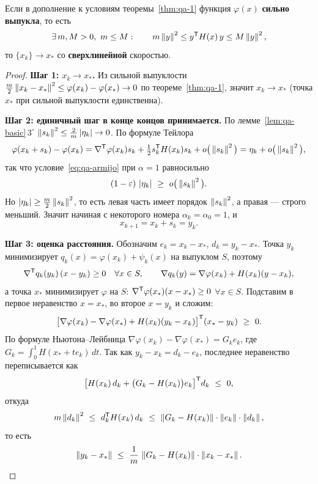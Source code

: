 \begin{theorem}\label{thm:qa-2}
Если в дополнение к условиям теоремы~\ref{thm:qa-1} функция $\varphi(x)$
\textbf{сильно выпукла}, то есть
\[
  \exists\, m, M > 0,\ m \le M : \qquad
  m \left\lVert y \right\rVert^2 \le y^{\mathsf{T}} H(x)\, y \le M \left\lVert y \right\rVert^2 ,
\]
то $\{x_k\} \to x_*$ со \textbf{сверхлинейной} скоростью.
\end{theorem}

\begin{idea}[title={Доказательство (на лекции не приводилось)}]
\begin{proof}
\textbf{Шаг 1: $x_k \to x_*$.} Из сильной выпуклости
$\tfrac{m}{2}\left\lVert x_k - x_* \right\rVert^2 \le \varphi(x_k) - \varphi(x_*) \to 0$ по
теореме~\ref{thm:qa-1}, значит $x_k \to x_*$ (точка $x_*$ при сильной
выпуклости единственна).

\medskip
\textbf{Шаг 2: единичный шаг в конце концов принимается.} По
лемме~\ref{lem:qa-basic}\,$3^\circ$
$\left\lVert s_k \right\rVert^2 \le \tfrac{2}{m}\left\lvert \eta_k \right\rvert \to 0$. По формуле Тейлора
\[
  \varphi(x_k + s_k) - \varphi(x_k)
  = \nabla^{\mathsf{T}}\varphi(x_k)s_k + \tfrac12 s_k^{\mathsf{T}} H(x_k) s_k + o\big(\left\lVert s_k \right\rVert^2\big)
  = \eta_k + o\big(\left\lVert s_k \right\rVert^2\big) ,
\]
так что условие~\eqref{eq:qa-armijo} при $\alpha = 1$ равносильно
\[
  (1 - \eps)\,\abs{\eta_k} \ \ge\ o\big(\norm{s_k}^2\big) .
\]
Но $\left\lvert \eta_k \right\rvert \ge \tfrac{m}{2}\left\lVert s_k \right\rVert^2$, то есть левая часть имеет
порядок $\left\lVert s_k \right\rVert^2$, а правая — строго меньший. Значит начиная с некоторого
номера $\alpha_k = \alpha_0 = 1$, и
\[
  x_{k+1} = x_k + s_k = y_k .
\]

\medskip
\textbf{Шаг 3: оценка расстояния.} Обозначим
$e_k = x_k - x_*$, $d_k = y_k - x_*$. Точка $y_k$ минимизирует
$q_k(x) = \varphi(x_k) + \psi_k(x)$ на выпуклом $S$, поэтому
\[
  \nabla^{\mathsf{T}} q_k(y_k)\,(x - y_k) \ge 0 \quad \forall x \in S ,
  \qquad
  \nabla q_k(y) = \nabla\varphi(x_k) + H(x_k)(y - x_k) ,
\]
а точка $x_*$ минимизирует $\varphi$ на $S$:
$\nabla^{\mathsf{T}}\varphi(x_*)(x - x_*) \ge 0$ $\forall x \in S$. Подставим в первое
неравенство $x = x_*$, во второе $x = y_k$ и сложим:
\[
  \big[\nabla\varphi(x_k) - \nabla\varphi(x_*) + H(x_k)(y_k - x_k)\big]^{\mathsf{T}}
  (x_* - y_k) \ \ge\ 0 .
\]
По формуле Ньютона--Лейбница
$\nabla\varphi(x_k) - \nabla\varphi(x_*) = G_k e_k$, где
$G_k = \int_0^1 H(x_* + t e_k)\,dt$. Так как $y_k - x_k = d_k - e_k$,
последнее неравенство переписывается как
\[
  \big[H(x_k)\, d_k + \big(G_k - H(x_k)\big) e_k\big]^{\mathsf{T}} d_k \ \le\ 0 ,
\]
откуда
\[
  m \left\lVert d_k \right\rVert^2 \ \le\ d_k^{\mathsf{T}} H(x_k)\, d_k
  \ \le\ \left\lVert G_k - H(x_k) \right\rVert \cdot \left\lVert e_k \right\rVert \cdot \left\lVert d_k \right\rVert ,
\]
то есть
\begin{equation}\label{eq:qa-rate}
  \left\lVert y_k - x_* \right\rVert \ \le\ \frac{1}{m}\,\left\lVert G_k - H(x_k) \right\rVert\cdot\left\lVert x_k - x_* \right\rVert .
\end{equation}


\end{proof}
\end{idea}
